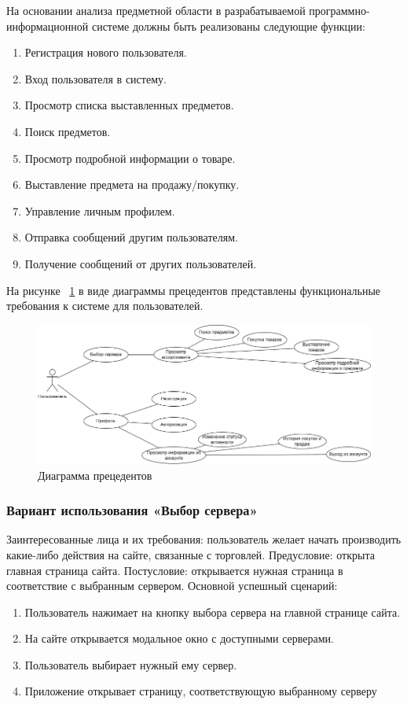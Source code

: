 На основании анализа предметной области в разрабатываемой программно-информационной системе должны быть реализованы следующие функции:
\begin{enumerate}
\item Регистрация нового пользователя.
\item Вход пользователя в систему.
\item Просмотр списка выставленных предметов.
\item Поиск предметов.
\item Просмотр подробной информации о товаре.
\item Выставление предмета на продажу/покупку.
\item Управление личным профилем.
\item Отправка сообщений другим пользователям.
\item Получение сообщений от других пользователей.
\end{enumerate}

На рисунке ~\ref{fig:-} в виде диаграммы прецедентов представлены функциональные требования к системе для пользователей.

\begin{figure}[th]
	\centering
	\includegraphics[width=1\linewidth]{"images/Диаграмма прецедентов"}
	\caption{Диаграмма прецедентов}
	\label{fig:-}
\end{figure}

\subsubsection{Вариант использования «Выбор сервера»}

Заинтересованные лица и их требования: пользователь желает начать производить какие-либо действия на сайте, связанные с торговлей.
Предусловие: открыта главная страница сайта.
Постусловие: открывается нужная страница в соответствие с выбранным сервером.
Основной успешный сценарий:
\begin{enumerate}
	\item Пользователь нажимает на кнопку выбора сервера на главной странице сайта.
	\item На сайте открывается модальное окно с доступными серверами.
	\item Пользователь выбирает нужный ему сервер.
	\item Приложение открывает страницу, соответствующую выбранному серверу
\end{enumerate}

